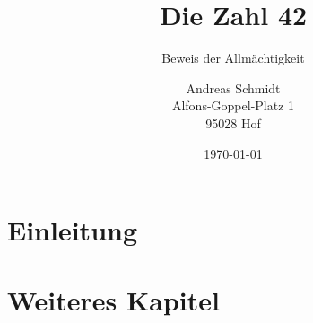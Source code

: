 \documentclass[a4paper,final]{hofuniversityinf}
\title{Die Zahl 42}
\subtitle{Beweis der Allmächtigkeit}
\author{
    Andreas Schmidt\\
    Alfons-Goppel-Platz 1\\
    95028 Hof
}
\date{\today}
\begin{document}

\makehead



\section{Einleitung}

\section{Weiteres Kapitel}

\printbibliography
\end{document}
